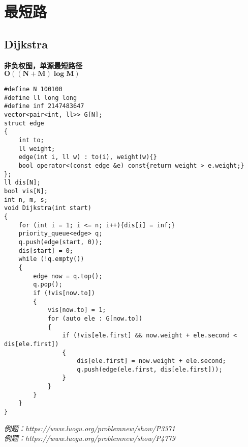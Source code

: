 \section{最短路}
\subsection{Dijkstra}
\textbf{非负权图，单源最短路径\\
\(
    \bm{O((N+M) \log M)}
\)
}
\begin{lstlisting}
#define N 100100
#define ll long long
#define inf 2147483647
vector<pair<int, ll>> G[N];
struct edge
{
    int to;
    ll weight;
    edge(int i, ll w) : to(i), weight(w){}
    bool operator<(const edge &e) const{return weight > e.weight;}
};
ll dis[N];
bool vis[N];
int n, m, s;
void Dijkstra(int start)
{
    for (int i = 1; i <= n; i++){dis[i] = inf;}
    priority_queue<edge> q;
    q.push(edge(start, 0));
    dis[start] = 0;
    while (!q.empty())
    {
        edge now = q.top();
        q.pop();
        if (!vis[now.to])
        {
            vis[now.to] = 1;
            for (auto ele : G[now.to])
            {
                if (!vis[ele.first] && now.weight + ele.second < dis[ele.first])
                {
                    dis[ele.first] = now.weight + ele.second;
                    q.push(edge(ele.first, dis[ele.first]));
                }
            }
        }
    }
}
\end{lstlisting}
\emph{例题：https://www.luogu.org/problemnew/show/P3371\\}
\emph{例题：https://www.luogu.org/problemnew/show/P4779}